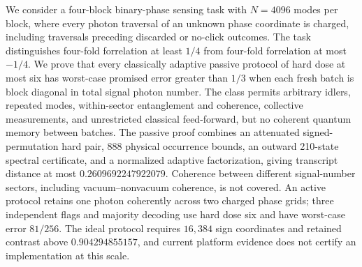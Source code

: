 We consider a four-block binary-phase sensing task with $N=4096$ modes per block, where every photon traversal of an unknown phase coordinate is charged, including traversals preceding discarded or no-click outcomes. The task distinguishes four-fold forrelation at least $1/4$ from four-fold forrelation at most $-1/4$. We prove that every classically adaptive passive protocol of hard dose at most six has worst-case promised error greater than $1/3$ when each fresh batch is block diagonal in total signal photon number. The class permits arbitrary idlers, repeated modes, within-sector entanglement and coherence, collective measurements, and unrestricted classical feed-forward, but no coherent quantum memory between batches. The passive proof combines an attenuated signed-permutation hard pair, 888 physical occurrence bounds, an outward 210-state spectral certificate, and a normalized adaptive factorization, giving transcript distance at most $0.2609692247922079$. Coherence between different signal-number sectors, including vacuum--nonvacuum coherence, is not covered. An active protocol retains one photon coherently across two charged phase grids; three independent flags and majority decoding use hard dose six and have worst-case error $81/256$. The ideal protocol requires $16{,}384$ sign coordinates and retained contrast above $0.904294855157$, and current platform evidence does not certify an implementation at this scale.
